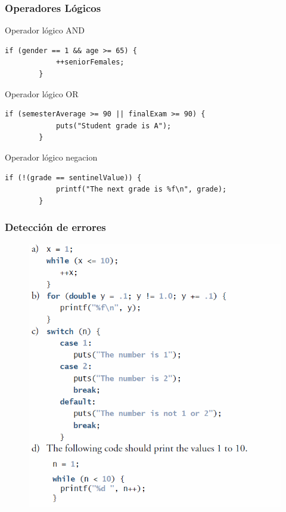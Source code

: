 \documentclass[10.5pt,scale=1.0,t,aspectratio=169,hyperref={pdfpagelabels=false}]{beamer}
\begin{document}
\begin{frame}[fragile]
	\frametitle{Operadores Lógicos}
	Operador lógico AND
	\begin{lstlisting}[style=CStyle]
		if (gender == 1 && age >= 65) {
			++seniorFemales;
		}
	\end{lstlisting}

	Operador lógico OR
	\begin{lstlisting}[style=CStyle]
		if (semesterAverage >= 90 || finalExam >= 90) {
			puts("Student grade is A");
		}
	\end{lstlisting}

	Operador lógico negacion
	\begin{lstlisting}[style=CStyle]
		if (!(grade == sentinelValue)) {
			printf("The next grade is %f\n", grade);
		}
	\end{lstlisting}
\end{frame}
\begin{frame}
	\frametitle{Detección de errores}
	\begin{figure}
		\centering
		\includegraphics[scale=0.7]{DeteccionErrores}
	\end{figure}
\end{frame}
\end{document}
